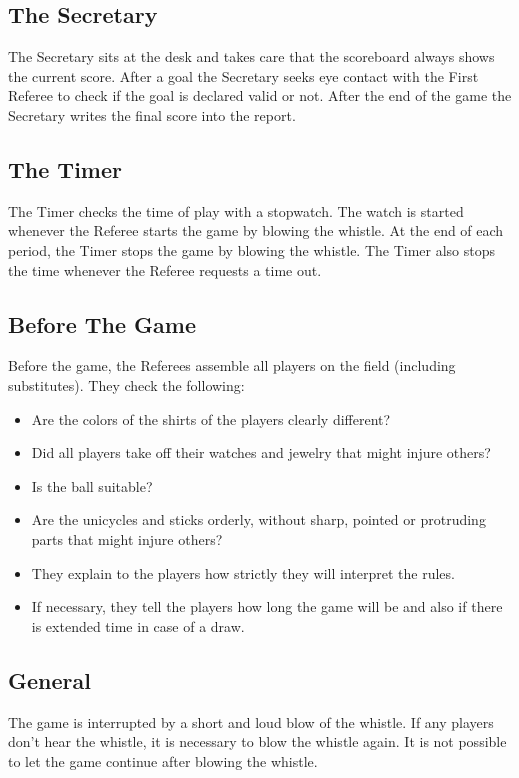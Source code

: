 \subsection{The Secretary}
The Secretary sits at the desk and takes care that the scoreboard always shows the current score.
After a goal the Secretary seeks eye contact with the First Referee to check if the goal is declared valid or not.
After the end of the game the Secretary writes the final score into the report.

\subsection{The Timer}
The Timer checks the time of play with a stopwatch.
The watch is started whenever the Referee starts the game by blowing the whistle.
At the end of each period, the Timer stops the game by blowing the whistle.
The Timer also stops the time whenever the Referee requests a time out.

\subsection{Before The Game}
Before the game, the Referees assemble all players on the field (including substitutes).
They check the following:
\begin{itemize}
\item Are the colors of the shirts of the players clearly different?
\item Did all players take off their watches and jewelry that might injure others?
\item Is the ball suitable?
\item Are the unicycles and sticks orderly, without sharp, pointed or protruding parts that might injure others?
\item They explain to the players how strictly they will interpret the rules.
\item If necessary, they tell the players how long the game will be and also if there is extended time in case of a draw.
\end{itemize}

\subsection{General}
The game is interrupted by a short and loud blow of the whistle.
If any players don't hear the whistle, it is necessary to blow the whistle again.
It is not possible to let the game continue after blowing the whistle.


